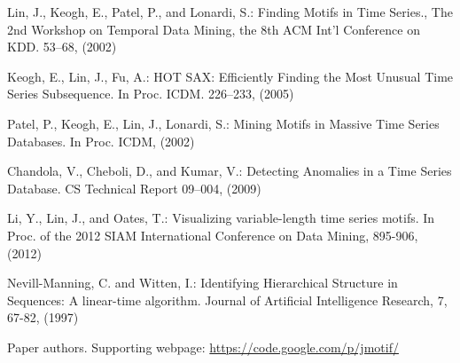 \documentclass{llncs}
\begin{document}
\begin{thebibliography}{4}


Lin, J., Keogh, E., Patel, P., and Lonardi, S.: 
Finding Motifs in Time Series., The 2nd Workshop on Temporal Data Mining, the 8th ACM Int'l Conference on KDD. 53--68, (2002)

Keogh, E., Lin, J., Fu, A.:
HOT SAX: Efficiently Finding the Most Unusual Time Series Subsequence. 
In Proc. ICDM. 226--233, (2005)

Patel, P., Keogh, E., Lin, J., Lonardi, S.:
Mining Motifs in Massive Time Series Databases. 
In Proc. ICDM, (2002)

Chandola, V., Cheboli, D., and Kumar, V.:
Detecting Anomalies in a Time Series Database.
CS Technical Report 09--004, (2009)

Li, Y., Lin, J., and Oates, T.: 
Visualizing variable-length time series motifs. 
In Proc. of the 2012 SIAM International Conference on Data Mining, 895-906, (2012)

Nevill-Manning, C. and Witten, I.:
Identifying Hierarchical Structure in Sequences: A linear-time algorithm. 
Journal of Artificial Intelligence Research, 7, 67-82, (1997)

Paper authors. Supporting webpage:
\url{https://code.google.com/p/jmotif/}

%

\end{thebibliography}
\end{document}
